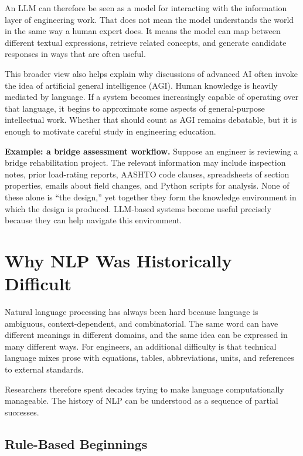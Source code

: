 \documentclass[12pt]{article}
\begin{document}
An LLM can therefore be seen as a model for interacting with the information layer of engineering work. That does not mean the model understands the world in the same way a human expert does. It means the model can map between different textual expressions, retrieve related concepts, and generate candidate responses in ways that are often useful.

This broader view also helps explain why discussions of advanced AI often invoke the idea of artificial general intelligence (AGI). Human knowledge is heavily mediated by language. If a system becomes increasingly capable of operating over that language, it begins to approximate some aspects of general-purpose intellectual work. Whether that should count as AGI remains debatable, but it is enough to motivate careful study in engineering education.

\begin{ex-box}
\textbf{Example: a bridge assessment workflow.} Suppose an engineer is reviewing a bridge rehabilitation project. The relevant information may include inspection notes, prior load-rating reports, AASHTO code clauses, spreadsheets of section properties, emails about field changes, and Python scripts for analysis. None of these alone is ``the design,'' yet together they form the knowledge environment in which the design is produced. LLM-based systems become useful precisely because they can help navigate this environment.
\end{ex-box}

\section{Why NLP Was Historically Difficult}

Natural language processing has always been hard because language is ambiguous, context-dependent, and combinatorial. The same word can have different meanings in different domains, and the same idea can be expressed in many different ways. For engineers, an additional difficulty is that technical language mixes prose with equations, tables, abbreviations, units, and references to external standards.

Researchers therefore spent decades trying to make language computationally manageable. The history of NLP can be understood as a sequence of partial successes.

\subsection{Rule-Based Beginnings}
\end{document}
